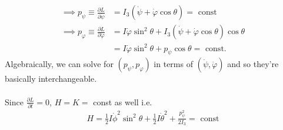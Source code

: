\documentclass[11pt]{article}
\begin{document}
\begin{align*}
  \implies p_{\psi} \equiv \frac{\partial L}{\partial \dot{\psi}} &= I_3 \left( \dot{\psi} + \dot{\varphi} \cos\theta \right) = \text{ const} \\
  \implies p_{\varphi} \equiv \frac{\partial L}{\partial \dot{\varphi}} &= I \dot{\varphi} \sin^2\theta + I_3 \left(\dot{\psi} + \dot{\varphi}\cos\theta\right) \cos\theta \\
  &= I \dot{\varphi} \sin^2\theta + p_{\psi} \cos\theta = \text{ const.}
\end{align*}
Algebraically, we can solve for $(p_{\psi}, p_{\varphi})$ in terms of $(\dot{\psi}, \dot{\varphi})$ and so they're basically interchangeable.
\\
\\
Since $\frac{\partial L}{\partial t} = 0$, $H = K =$ const as well i.e. 
\begin{align*}
  H = \frac{1}{2}I\dot{\phi}^2 \sin^2\theta + \frac{1}{2}I \dot{\theta}^2 + \frac{p_{\psi}^2}{2I_3} = \text{ const}
\end{align*}

\vskip 1cm
\end{document}
